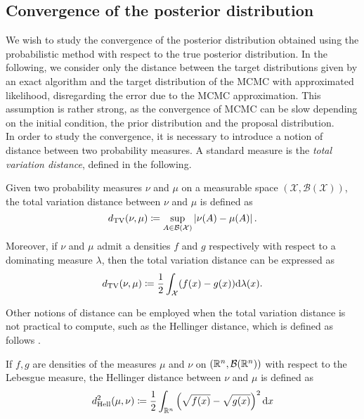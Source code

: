 \subsection{Convergence of the posterior distribution}

We wish to study the convergence of the posterior distribution obtained using the probabilistic method with respect to the true posterior distribution. In the following, we consider only the distance between the target distributions given by an exact algorithm and the target distribution of the MCMC with approximated likelihood, disregarding the error due to the MCMC approximation. This assumption is rather strong, as the convergence of MCMC can be slow depending on the initial condition, the prior distribution and the proposal distribution. \\
In order to study the convergence, it is necessary to introduce a notion of distance between two probability measures. A standard measure is the \textit{total variation distance}, defined in the following.
\begin{definition} Given two probability measures $\nu$ and $\mu$ on a measurable space $(\mathcal{X}, \mathcal{B}(\mathcal{X}))$, the total variation distance between $\nu$ and $\mu$ is defined as
\begin{equation}
	d_{\mathrm{TV}}(\nu,\mu) \coloneqq \sup_{A\in \mathcal{B}(\mathcal{X})} \left|\nu(A) - \mu(A)\right|.
\end{equation}
Moreover, if $\nu$ and $\mu$ admit a densities $f$ and $g$ respectively with respect to a dominating measure $\lambda$, then the total variation distance can be expressed as
\begin{equation}
	d_{\mathrm{TV}}(\nu,\mu) \coloneqq \frac{1}{2} \int_{\mathcal{X}} (f(x) - g(x))\dd \lambda(x).
\end{equation}
\end{definition}
\noindent Other notions of distance can be employed when the total variation distance is not practical to compute, such as the Hellinger distance, which is defined as follows \cite{GiS02}.
\begin{definition} If $f, g$ are densities of the measures $\mu$ and $\nu$ on $(\mathbb{R}^n, \mathcal{B}(\mathbb{R}^n))$ with respect to the Lebesgue measure, the Hellinger distance between $\nu$ and $\mu$ is defined as
\begin{equation}
	d_{\mathrm{Hell}}^2(\mu, \nu) \coloneqq \frac{1}{2}\int_{\mathbb{R}^n}\left(\sqrt{f(x)} - \sqrt{g(x)}\right)^2\dd x
\end{equation}
\end{definition}
